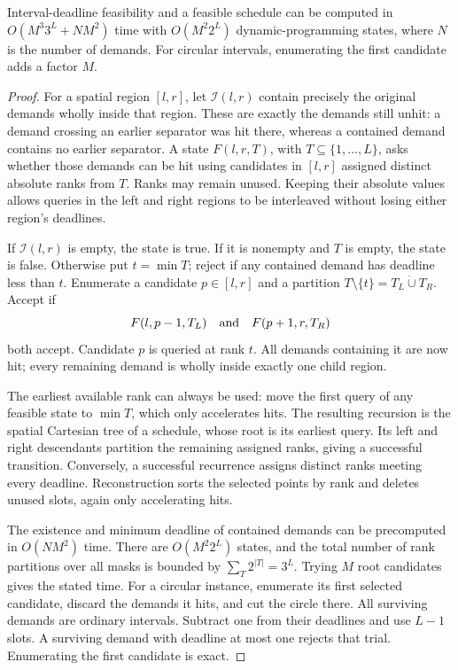 \begin{lemma}
\label{lem:rank-subset-scheduling}
Interval-deadline feasibility and a feasible schedule can be computed
in $O(M^3 3^L+NM^2)$ time with $O(M^2 2^L)$ dynamic-programming
states, where $N$ is the number of demands. For circular intervals,
enumerating the first candidate adds a factor $M$.
\end{lemma}
\begin{proof}
For a spatial region $[l,r]$, let $\mathcal I(l,r)$ contain precisely
the original demands wholly inside that region. These are exactly
the demands still unhit: a demand crossing an earlier separator was
hit there, whereas a contained demand contains no earlier separator.
A state
$F(l,r,T)$, with $T\subseteq\{1,\ldots,L\}$, asks whether those
demands can be hit using candidates in $[l,r]$ assigned distinct
absolute ranks from $T$. Ranks may remain unused.
Keeping their absolute values allows queries in the left and right
regions to be interleaved without losing either region's deadlines.

If $\mathcal I(l,r)$ is empty, the state is true. If it is nonempty
and $T$ is empty, the state is false. Otherwise put $t=\min T$;
reject if any contained demand has deadline less than $t$. Enumerate
a candidate $p\in[l,r]$ and a partition
$T\setminus\{t\}=T_L\mathbin{\dot\cup}T_R$. Accept if
\[
 F(l,p-1,T_L)\quad\hbox{and}\quad F(p+1,r,T_R)
\]
both accept. Candidate $p$ is queried at rank $t$. All demands
containing it are now hit; every remaining demand is wholly inside
exactly one child region.

The earliest available rank can always be used: move the first query
of any feasible state to $\min T$, which only accelerates hits.
The resulting recursion is the spatial Cartesian tree of a schedule,
whose root is its earliest query. Its left and right descendants
partition the remaining assigned ranks, giving a successful transition.
Conversely, a successful recurrence
assigns distinct ranks meeting every deadline. Reconstruction sorts
the selected points by rank and deletes unused slots, again only
accelerating hits.

The existence and minimum deadline of contained demands can be
precomputed in $O(NM^2)$ time. There are $O(M^2 2^L)$ states, and
the total number of rank partitions over all masks is bounded by
$\sum_T2^{|T|}=3^L$. Trying $M$ root candidates gives the stated time.
For a circular instance, enumerate its first selected candidate,
discard the demands it hits, and cut the circle there. All surviving
demands are ordinary intervals. Subtract one from their deadlines and
use $L-1$ slots. A surviving demand with deadline at most one rejects
that trial. Enumerating the first candidate is exact.
\end{proof}

